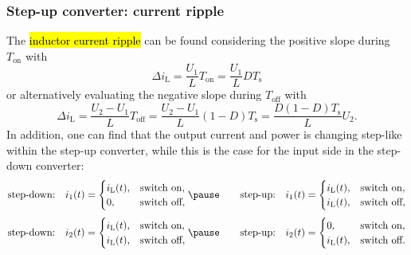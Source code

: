 \begin{frame}
    \frametitle{Step-up converter: current ripple}
    The \hl{inductor current ripple} can be found considering the positive slope during $T_\mathrm{on}$ with
    \begin{equation}
        \Delta i_\mathrm{L} = \frac{U_1}{L}T_\mathrm{on} = \frac{U_1}{L}DT_\mathrm{s}
        \label{eq:current-ripple-simple-step-up-pos}
    \end{equation}\pause
    or alternatively evaluating the negative slope during $T_\mathrm{off}$ with
    \begin{equation}
        \Delta i_\mathrm{L} = \frac{U_2-U_1}{L}T_\mathrm{off} = \frac{U_2-U_1}{L}(1-D)T_\mathrm{s}=\frac{D(1-D)T_\mathrm{s}}{L}U_2.
        \label{eq:current-ripple-simple-step-up-neg}
    \end{equation}\pause
    In addition, one can find that the output current and power is changing step-like within the step-up converter, while this is the case for the input side in the step-down converter: 
    \begin{equation*}
        \mbox{step-down:} \quad i_1(t) = \begin{cases}
            i_\mathrm{L}(t), & \mbox{switch on},\\
            0, & \mbox{switch off},
        \end{cases}\pause
        \qquad
        \mbox{step-up:} \quad i_1(t) = \begin{cases}
            i_\mathrm{L}(t), & \mbox{switch on},\\
            i_\mathrm{L}(t), & \mbox{switch off},
        \end{cases}
    \end{equation*}\pause
    \begin{equation*}
        \mbox{step-down:} \quad i_2(t) = \begin{cases}
            i_\mathrm{L}(t), & \mbox{switch on},\\
            i_\mathrm{L}(t), & \mbox{switch off},
        \end{cases}\pause
        \qquad
        \mbox{step-up:} \quad i_2(t) = \begin{cases}
            0, & \mbox{switch on},\\
            i_\mathrm{L}(t), & \mbox{switch off}.
        \end{cases}
    \end{equation*}
\end{frame}


